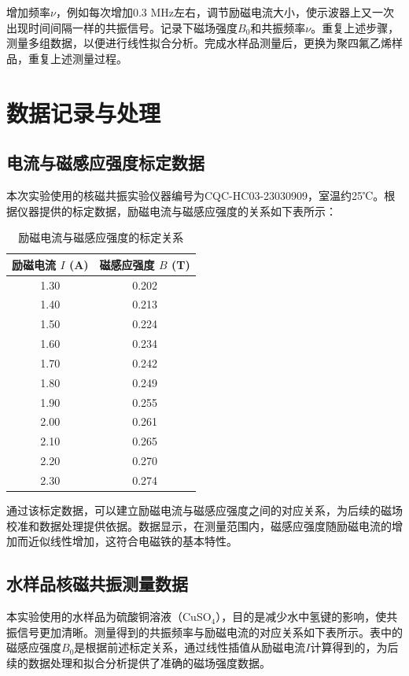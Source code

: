 ﻿\documentclass[12pt,a4paper]{article}
\begin{document}
增加频率$\nu$，例如每次增加0.3 MHz左右，调节励磁电流大小，使示波器上又一次出现时间间隔一样的共振信号。记录下磁场强度$B_0$和共振频率$\nu$。重复上述步骤，测量多组数据，以便进行线性拟合分析。完成水样品测量后，更换为聚四氟乙烯样品，重复上述测量过程。

\section{数据记录与处理}

\subsection{电流与磁感应强度标定数据}

本次实验使用的核磁共振实验仪器编号为CQC-HC03-23030909，室温约25℃。根据仪器提供的标定数据，励磁电流与磁感应强度的关系如下表所示：

\begin{table}[H]
\centering
\begin{tabular}{|c|c|}
\hline
励磁电流 $I$ (A) & 磁感应强度 $B$ (T) \\
\hline
1.30 & 0.202 \\
\hline
1.40 & 0.213 \\
\hline
1.50 & 0.224 \\
\hline
1.60 & 0.234 \\
\hline
1.70 & 0.242 \\
\hline
1.80 & 0.249 \\
\hline
1.90 & 0.255 \\
\hline
2.00 & 0.261 \\
\hline
2.10 & 0.265 \\
\hline
2.20 & 0.270 \\
\hline
2.30 & 0.274 \\
\hline
\end{tabular}
\caption{励磁电流与磁感应强度的标定关系}
\end{table}

通过该标定数据，可以建立励磁电流与磁感应强度之间的对应关系，为后续的磁场校准和数据处理提供依据。数据显示，在测量范围内，磁感应强度随励磁电流的增加而近似线性增加，这符合电磁铁的基本特性。

\subsection{水样品核磁共振测量数据}

本实验使用的水样品为硫酸铜溶液（CuSO$_4$），目的是减少水中氢键的影响，使共振信号更加清晰。测量得到的共振频率与励磁电流的对应关系如下表所示。表中的磁感应强度$B_0$是根据前述标定关系，通过线性插值从励磁电流$I$计算得到的，为后续的数据处理和拟合分析提供了准确的磁场强度数据。
\end{document}
